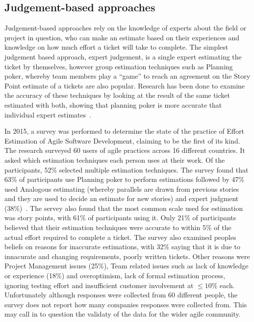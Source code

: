 \documentclass{UoYCSproject}
\begin{document}
    \subsection{Judgement-based approaches}
    \label{subsec:judgement-based-approaches}

    Judgement-based approaches rely on the knowledge of experts about the field or project in question, who can make an estimate based on their experiences and knowledge on how much effort a ticket will take to complete.
    The simplest judgement based approach, expert judgement, is a single expert estimating the ticket by themselves, however group estimation techniques such as Planning poker, whereby team members play a “game” to reach an agreement on the Story Point estimate of a tickets are also popular.
    Research has been done to examine the accuracy of these techniques by looking at the result of the same ticket estimated with both, showing that planning poker is more accurate that individual expert estimates~\cite{MAHNIC20122086, RashidSCE}. \par
    In 2015, a survey was performed to determine the state of the practice of Effort Estimation of Agile Software Development, claiming to be the first of its kind.
    The research surveyed 60 users of agile practices across 16 different countries.
    It asked which estimation techniques each person uses at their work.
    Of the participants, 52\% selected multiple estimation techniques.
    The survey found that 63\% of participants use Planning poker to perform estimations followed by 47\% used Analogous estimating (whereby parallels are drawn from previous stories and they are used to decide an estimate for new stories) and expert judgment (38\%)~\cite{effortestimationsurvey}.
    The servey also found that the most common scale used for estimation was story points, with 61\% of participants using it.
    Only 21\% of participants believed that their estimation techniques were accurate to within 5\% of the actual effort required to complete a ticket.
    The survey also examined peoples beliefs on reasons for inaccurate estimations, with 32\% saying that it is due to innacurate and changing requirements, poorly written tickets.
    Other reasons were Project Management issues (25\%), Team related issues such as lack of knowledge or experience (18\%) and overoptimism, lack of formal estimation process, ignoring testing effort and insufficient customer involvement at $\leq 10$\% each.
    Unfortunately although responses were collected from 60 different people, the survey does not report how many companies responses were collected from. This may call in to question the validaty of the data for the wider agile community. \par
\end{document}
